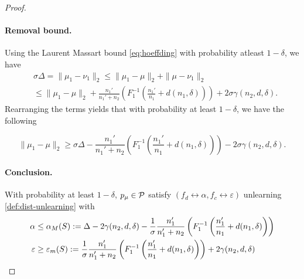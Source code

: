 \begin{proof}
\paragraph{Removal bound.}
Using the Laurent Massart bound \ref{eq:hoeffding} with probability atleast $1-\delta$, we have
\begin{align*}
    &
   \sigma \Delta= \|\mu_1 - \nu_1\|_2 
     \leq \|\mu_1 - \mu\|_2 + \|\mu - \nu_1\|_2
    \\
    &\leq \|\mu_1 - \mu\|_2
    + 
    \frac{n_1'}{n_1' + n_2} 
    \left(F_1^{-1}\left(\frac{n_1'}{n_1} +d(n_1, \delta)\right)\right)
    + 
     2\sigma \gamma(n_2,d,\delta).
\end{align*}
Rearranging the terms yields that with probability at least $1-\delta$, we have the following


\begin{equation}
    \|\mu_1 - \mu\|_2\geq  \sigma \Delta - \frac{n_1'}{n_1' + n_2} 
    \left(F_1^{-1}\left(\frac{n_1'}{n_1} +d(n_1, \delta)\right)\right)
    -
     2 \sigma \gamma(n_2,d,\delta).
\end{equation}
\paragraph{Conclusion.}
With probability at least $1-\delta$, $p_{\mu}\in \mathcal{P}$ satisfy  $(f_d \leftrightarrow \alpha, f_c \leftrightarrow \varepsilon)$ unlearning \ref{def:dist-unlearning} with
\begin{align*}
    \alpha
    &
    \leq 
   \alpha_M(S):= \Delta - 2\gamma(n_2,d,\delta) - \frac{1}{\sigma}\frac{n_1'}{n_1' + n_2} 
    \left(F_1^{-1}\left(\frac{n_1'}{n_1} +d(n_1, \delta)\right)\right)
    \\
    \varepsilon &
    \geq  
    \varepsilon_m(S):= 
    \frac{1}{\sigma}\frac{n_1'}{n_1' + n_2} 
    \left(F_1^{-1}\left(\frac{n_1'}{n_1} +d(n_1, \delta)\right)\right)
    + 
    2\gamma(n_2,d,\delta)
\end{align*}
\end{proof}
